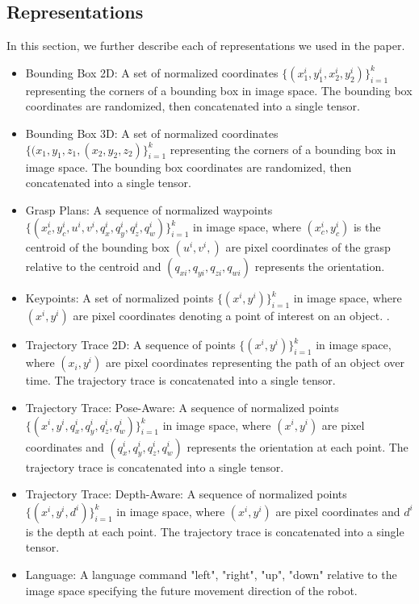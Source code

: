 \documentclass[conference,dvipsnames]{IEEEtran}
\begin{document}
\subsection{Representations}
In this section, we further describe each of representations we used in the paper. 
\begin{itemize}
\item Bounding Box 2D: A set of normalized coordinates $\{(x^{i}_{1}, y^{i}_{1}, x^{i}_{2}, y^{i}_{2})\}_{i=1}^{k}$ representing the corners of a bounding box in image space. The bounding box coordinates are randomized, then concatenated into a single tensor.
\item Bounding Box 3D: A set of normalized coordinates $\{(x_{1}, y_{1}, z_{1}, (x_{2}, y_{2}, z_{2})\}_{i=1}^{k}$ representing the corners of a bounding box in image space.  The bounding box coordinates are randomized, then concatenated into a single tensor.
\item Grasp Plans: A sequence of normalized waypoints 
$\{(x^{i}_{c}, y^{i}_{c}, u^{i}, v^{i}, q^{i}_{x}, q^{i}_{y}, q^{i}_{z}, q^{i}_{w})\}_{i=1}^{k}$
in image space, where $(x^{i}_{c}, y^{i}_{c})$ is the centroid of the bounding box $(u^{i}, v^{i},)$ are pixel coordinates of the grasp relative to the centroid and $(q_{xi}, q_{yi}, q_{zi}, q_{wi})$ represents the orientation.
\item Keypoints: A set of normalized points \(\{(x^{i}, y^{i})\}_{i=1}^{k}\) in image space, where \((x^{i}, y^{i})\) are pixel coordinates denoting a point of interest on an object. .
\item Trajectory Trace 2D: A sequence of points $\{(x^{i}, y^{i})\}_{i=1}^{k}$ in image space, where $(x_{i}, y^{i})$ are pixel coordinates representing the path of an object over time. The trajectory trace is concatenated into a single tensor.
\item Trajectory Trace: Pose-Aware: A sequence of normalized points $\{(x^{i}, y^{i}, q^{i}_{x}, q^{i}_{y}, q^{i}_{z}, q^{i}_{w})\}_{i=1}^{k}$ in image space, where $(x^{i}, y^{i})$ are pixel coordinates and $(q^{i}_{x}, q^{i}_{y}, q^{i}_{z}, q^{i}_{w})$ represents the orientation at each point. The trajectory trace is concatenated into a single tensor.
\item Trajectory Trace: Depth-Aware: A sequence of normalized points $\{(x^{i}, y^{i}, d^{i})\}_{i=1}^{k}$ in image space, where $(x^{i}, y^{i})$ are pixel coordinates and $d^{i}$ is the depth at each point. The trajectory trace is concatenated into a single tensor.
\item Language: A language command "left", "right", "up", "down" relative to the image space specifying the future movement direction of the robot.
\end{itemize}
\end{document}
